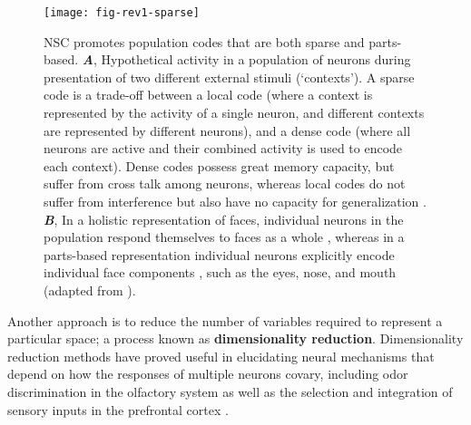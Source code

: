 \begin{figure}[h]
	\centering
	\texttt{[image: fig-rev1-sparse]}
    \caption{\Acf{NSC} promotes population codes that are both sparse and parts-based.
    \textbf{\emph{A}},
    	   Hypothetical activity in a population of neurons
           during presentation of two different external stimuli (`contexts').
           A sparse code is a trade-off between a local code
           (where a context is represented by the activity of a single neuron,
           and different contexts are represented by different neurons), and a
           dense code (where all neurons are active and their combined activity is
           used to encode each context).
           Dense codes possess great memory capacity, but suffer from cross talk
           among neurons, whereas local codes do not suffer from interference
           but also have no capacity for generalization
           .
     \textbf{\emph{B}},
           In a holistic representation of faces, 
           individual neurons in the population
           respond themselves to faces as a whole \cite{TanakaFarah1993},
           whereas in a parts-based representation
           individual neurons explicitly encode individual face components
           \cite{Palmer1977},
           such as the eyes, nose, and mouth
           (adapted from \cite{LeeSeung1999} ).}
	\label{fig:sparse-parts}
\end{figure}


Another approach is to reduce the number of
variables required to represent a particular  space;
a process known as
\textbf{dimensionality reduction}.
Dimensionality reduction methods have proved useful in elucidating neural mechanisms
that depend on how the responses of multiple neurons covary,
including odor discrimination in the olfactory system \cite{Broome2006,Koulakov2011}
as well as the selection and integration of sensory inputs 
in the prefrontal cortex \cite{Mante2013}.

